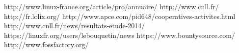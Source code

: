\documentclass[a4paper,12pt, draft]{report}
\begin{document}
\renewcommand{\bibname}{Webographie} 

\begin{thebibliography}{12}
 http://www.linux-france.org/article/pro/annuaire/
 http://www.cnll.fr/
 http://fr.lolix.org/
 http://www.apce.com/pid648/cooperatives-activites.html
 http://www.cnll.fr/news/resultats-etude-2014/
 https://linuxfr.org/users/lebouquetin/news
 https://www.bountysource.com/
 http://www.fossfactory.org/
\end{thebibliography}
\end{document}
